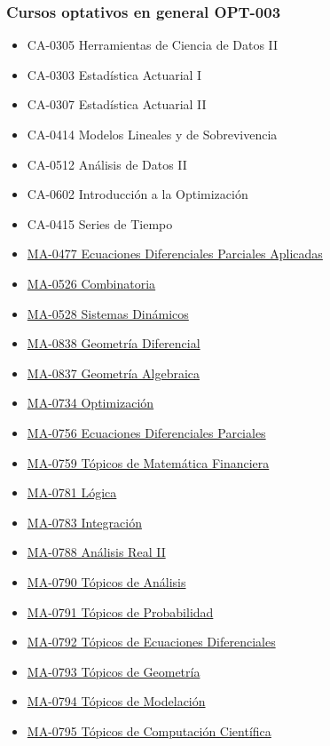 \subsubsection*{Cursos optativos en general OPT-003}


\begin{itemize}
    \item {CA-0305 Herramientas de Ciencia de Datos II}
    \item {CA-0303 Estadística Actuarial I}
    \item {CA-0307 Estadística Actuarial II}
    \item {CA-0414 Modelos Lineales y de Sobrevivencia}
    \item {CA-0512 Análisis de Datos II}
    \item {CA-0602 Introducción a la Optimización}
    \item {CA-0415 Series de Tiempo}
    \item \hyperlink{MA0477}{MA-0477 Ecuaciones Diferenciales Parciales Aplicadas}
    \item \hyperlink{MA0526}{MA-0526 Combinatoria}
    \item \hyperlink{MA0528}{MA-0528 Sistemas Dinámicos}
    \item \hyperlink{MA0838}{MA-0838 Geometría Diferencial}
    \item \hyperlink{MA0837}{MA-0837 Geometría Algebraica}
    \item \hyperlink{MA0734}{MA-0734 Optimización}
    \item \hyperlink{MA0756}{MA-0756 Ecuaciones Diferenciales Parciales}
    \item \hyperlink{MA0759}{MA-0759 Tópicos de Matemática Financiera}
    \item \hyperlink{MA0781}{MA-0781 Lógica}
    \item \hyperlink{MA0783}{MA-0783 Integración}
    \item \hyperlink{MA0788}{MA-0788 Análisis Real II}
    \item \hyperlink{MA0790}{MA-0790 Tópicos de Análisis}
    \item \hyperlink{MA0791}{MA-0791 Tópicos de Probabilidad}
    \item \hyperlink{MA0792}{MA-0792 Tópicos de Ecuaciones Diferenciales}
    \item \hyperlink{MA0793}{MA-0793 Tópicos de Geometría}
    \item \hyperlink{MA0794}{MA-0794 Tópicos de Modelación}
    \item \hyperlink{MA0795}{MA-0795 Tópicos de Computación Científica}

\end{itemize}
